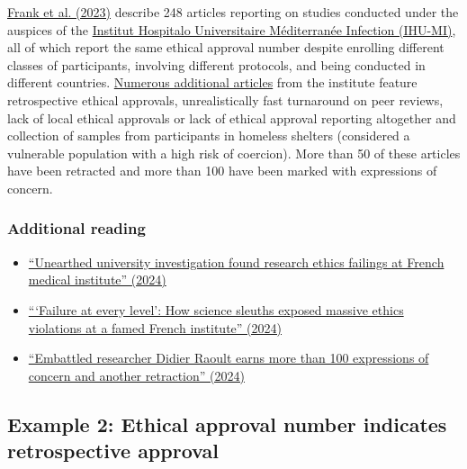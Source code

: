 \documentclass[letterpaper, 12pt]{article}
\begin{document}
\href{https://doi.org/10.1186/s41073-023-00134-4}{Frank et al. (2023)} describe 248 articles reporting on studies conducted under the auspices of the \href{https://www.mediterranee-infection.com/}{Institut Hospitalo Universitaire Méditerranée Infection (IHU-MI)}, all of which report the same ethical approval number despite enrolling different classes of participants, involving different protocols, and being conducted in different countries. \href{https://ihu-correction.com/}{Numerous additional articles} from the institute feature retrospective ethical approvals, unrealistically fast turnaround on peer reviews, lack of local ethical approvals or lack of ethical approval reporting altogether and collection of samples from participants in homeless shelters (considered a vulnerable population with a high risk of coercion). More than 50 of these articles have been retracted and more than 100 have been marked with expressions of concern.

\subsubsection*{Additional reading}

\begin{itemize}
    \setlength\itemsep{-0.5em}
    \item \href{https://www.science.org/content/article/unearthed-university-investigation-found-research-ethics-failings-french-medical}{``Unearthed university investigation found research ethics failings at French medical institute'' (2024)}
    \item \href{https://www.science.org/content/article/failure-every-level-how-science-sleuths-exposed-massive-ethics-violations-famed-french}{```Failure at every level': How science sleuths exposed massive ethics violations at a famed French institute'' (2024)}
    \item \href{https://retractionwatch.com/2024/04/03/embattled-researcher-didier-raoult-earns-dozens-more-expressions-of-concern-and-another-retraction/}{``Embattled researcher Didier Raoult earns more than 100 expressions of concern and another retraction'' (2024)}
\end{itemize}

\subsection*{Example 2: Ethical approval number indicates retrospective approval}
\end{document}
